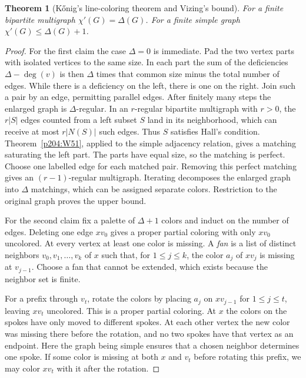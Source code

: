 \documentclass[11pt,oneside,openany]{book}
\theoremstyle{plain}
\newtheorem{theorem}{Theorem}[chapter]
\theoremstyle{definition}
\theoremstyle{remark}
\begin{document}
\begin{theorem}[K\H{o}nig's line-coloring theorem and Vizing's bound]
\label{p204:W61}
For a finite bipartite multigraph \(\chi'(G)=\Delta(G)\).
For a finite simple graph \(\chi'(G)\le\Delta(G)+1\).
\end{theorem}
\begin{proof}
For the first claim the case \(\Delta=0\) is immediate. Pad the
two vertex parts with isolated vertices to the same size. In each
part the sum of the deficiencies \(\Delta-\deg(v)\) is then
\(\Delta\) times that common size minus the total number of edges.
While there is a deficiency on the left, there is one on the
right. Join such a pair by an edge, permitting parallel edges.
After finitely many steps the enlarged graph is \(\Delta\)-regular.
In an \(r\)-regular bipartite multigraph with \(r>0\), the \(r|S|\)
edges counted from a left subset \(S\) land in its neighborhood,
which can receive at most \(r|N(S)|\) such edges. Thus \(S\)
satisfies Hall's condition. Theorem~\ref{p204:W51}, applied to the
simple adjacency relation, gives a matching saturating the left
part. The parts have equal size, so the matching is perfect.
Choose one labelled edge for each matched pair. Removing this
perfect matching gives an \((r-1)\)-regular multigraph. Iterating
decomposes the enlarged graph into \(\Delta\) matchings, which can
be assigned separate colors. Restriction to the original graph
proves the upper bound.

For the second claim fix a palette of \(\Delta+1\) colors and
induct on the number of edges. Deleting one edge \(xv_0\) gives
a proper partial coloring with only \(xv_0\) uncolored. At
every vertex at least one color is missing. A \emph{fan} is a
list of distinct neighbors \(v_0,v_1,\ldots,v_k\) of \(x\)
such that, for \(1\le j\le k\), the color \(a_j\) of \(xv_j\)
is missing at \(v_{j-1}\). Choose a fan that cannot be extended,
which exists because the neighbor set is finite.

For a prefix through \(v_t\), rotate the colors by placing
\(a_j\) on \(xv_{j-1}\) for \(1\le j\le t\), leaving \(xv_t\)
uncolored. This is a proper partial coloring. At \(x\) the
colors on the spokes have only moved to different spokes. At
each other vertex the new color was missing there before the
rotation, and no two spokes have that vertex as an endpoint.
Here the graph being simple ensures that a chosen neighbor
determines one spoke. If some color is missing at both \(x\)
and \(v_t\) before rotating this prefix, we may color \(xv_t\)
with it after the rotation.


\end{proof}
\end{document}
